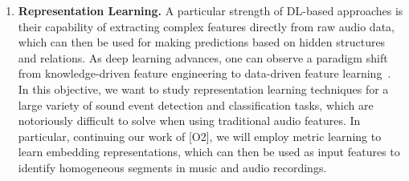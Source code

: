 \documentclass[11pt,a4paper]{article}
\newcommand{\jakob}[1]{{\color{magenta} #1}}
\newcommand{\christof}[1]{{\color{blue} #1}}
\theoremstyle{plain} \newtheorem{define}{Definition}[section]
\begin{document}
{\begin{enumerate}
\item \label{objective:renew_replearn}
\textbf{Representation Learning.}
%
%
%
A particular strength of DL-based approaches is their capability of extracting complex features directly from raw audio data, which can then be used for making predictions based on hidden structures and relations. As deep learning advances, one can observe a paradigm shift from knowledge-driven feature engineering to data-driven feature learning~\cite{GoodfellowBC16_DeepLearning_Book,HumphreyBL12_ISMIR}. In this objective, we want to study representation learning techniques for a large variety of sound event detection and classification tasks, which are notoriously difficult to solve when using traditional audio features. 
%
In particular, continuing our work of [O2], we will employ metric learning \cite{Schroff:2015:FaceNet:ARXIV} to learn embedding representations, which can then be used as input features to identify homogeneous segments in music and audio recordings.

\end{enumerate}}
\end{document}
